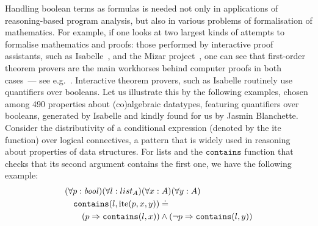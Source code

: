 Handling boolean terms as formulas is needed not only in applications of reasoning-based program analysis, but also in various problems of formalisation of mathematics.
For example, if one looks at two largest kinds of attempts to formalise mathematics and proofs: those performed by interactive proof assistants, such as Isabelle~\cite{Isabelle},  and the Mizar project~\cite{Mizar}, one can see that first-order theorem provers are the main workhorses behind computer proofs in both cases~--- see e.g.~\cite{Sledgehammer,DBLP:conf/icms/UrbanHV10}.
Interactive theorem provers, such as Isabelle routinely use quantifiers over booleans.  Let us illustrate this by the
following examples, chosen among 490 properties about (co)algebraic datatypes, featuring quantifiers over booleans, generated by Isabelle and kindly found for us by Jasmin Blanchette. Consider the distributivity of a conditional expression (denoted by the $\mathrm{ite}$ function) over logical connectives, a pattern that is widely used in reasoning about properties of data structures. For lists and the $\mathtt{contains}$ function that checks that its second argument contains the first one, we have the following example:
\begin{gather}\label{formula:contains}
  \begin{aligned}
&(\forall{{p}:{\mathit{bool}}})(\forall{{l}:{list_A}})(\forall{{x}:{A}})(\forall{{y}:{A}}) \\
&\quad\mathtt{contains}(l,\mathrm{ite}(p,x,y)) \doteq \\
&\quad\quad(p \Rightarrow \mathtt{contains}(l,x)) \wedge (\neg p \Rightarrow \mathtt{contains}(l,y))
 \end{aligned}
\end{gather}

